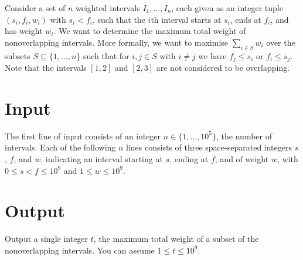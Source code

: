 

\noindent
Consider a set of $n$ weighted intervals $I_1,\ldots, I_n$, each given as an integer tuple $(s_i, f_i, w_i)$ with $s_i<f_i$, such that the $i$th interval starts at $s_i$, ends at $f_i$, and has weight $w_i$.
We want to determine the maximum total weight of nonoverlapping intervals.
More formally, we want to maximise $\sum_{i\in S} w_i$ over the subsets $S\subseteq \{1,\ldots,n\}$ such that for $i, j\in S$ with $i\neq j$ we have $f_j \leq s_i$ or $f_i\leq s_j$. 
Note that the intervals $[1,2]$ and $[2,3]$ are not considered to be overlapping.

\section*{Input}

The first line of input consists of an integer $n\in\{1,\ldots, 10^5\}$, the number of intervals.
Each of the following $n$ lines consists of three space-separated integers $s$, $f$, and $w$, indicating an interval starting at $s$, ending at $f$, and of weight $w$, with $0\leq s<f\leq 10^9$ and $1\leq w\leq 10^9$.


\section*{Output}

Output a single integer $t$, the maximum total weight of a subset of the nonoverlapping intervals.
You can assume  $1\leq t\leq 10^9$.
